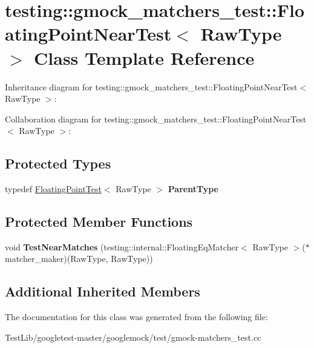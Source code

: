 \hypertarget{classtesting_1_1gmock__matchers__test_1_1FloatingPointNearTest}{}\section{testing\+:\+:gmock\+\_\+matchers\+\_\+test\+:\+:Floating\+Point\+Near\+Test$<$ Raw\+Type $>$ Class Template Reference}
\label{classtesting_1_1gmock__matchers__test_1_1FloatingPointNearTest}


Inheritance diagram for testing\+:\+:gmock\+\_\+matchers\+\_\+test\+:\+:Floating\+Point\+Near\+Test$<$ Raw\+Type $>$\+:


Collaboration diagram for testing\+:\+:gmock\+\_\+matchers\+\_\+test\+:\+:Floating\+Point\+Near\+Test$<$ Raw\+Type $>$\+:
\subsection*{Protected Types}
\begin{DoxyCompactItemize}
\item 
\mbox{\label{classtesting_1_1gmock__matchers__test_1_1FloatingPointNearTest_ac767d2bf3e518d1e7cf9dfafc76cc53a}} 
typedef \hyperlink{classtesting_1_1gmock__matchers__test_1_1FloatingPointTest}{Floating\+Point\+Test}$<$ Raw\+Type $>$ {\bfseries Parent\+Type}
\end{DoxyCompactItemize}
\subsection*{Protected Member Functions}
\begin{DoxyCompactItemize}
\item 
\mbox{\label{classtesting_1_1gmock__matchers__test_1_1FloatingPointNearTest_a712b564197ab76f58d345c5e3e73955d}} 
void {\bfseries Test\+Near\+Matches} (testing\+::internal\+::\+Floating\+Eq\+Matcher$<$ Raw\+Type $>$($\ast$matcher\+\_\+maker)(Raw\+Type, Raw\+Type))
\end{DoxyCompactItemize}
\subsection*{Additional Inherited Members}


The documentation for this class was generated from the following file\+:\begin{DoxyCompactItemize}
\item 
Test\+Lib/googletest-\/master/googlemock/test/gmock-\/matchers\+\_\+test.\+cc\end{DoxyCompactItemize}

